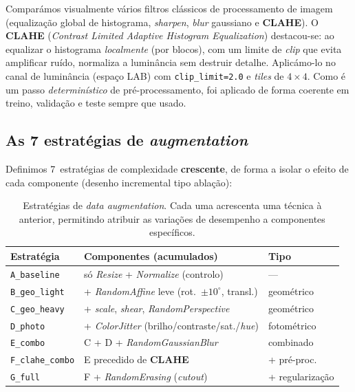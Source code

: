 \documentclass[11pt,a4paper]{article}
\begin{document}
Comparámos visualmente vários filtros clássicos de processamento de imagem (equalização
global de histograma, \emph{sharpen}, \emph{blur} gaussiano e \textbf{CLAHE}). O
\textbf{CLAHE} (\emph{Contrast Limited Adaptive Histogram Equalization}) destacou-se: ao
equalizar o histograma \emph{localmente} (por blocos), com um limite de \emph{clip} que
evita amplificar ruído, normaliza a luminância sem destruir detalhe. Aplicámo-lo no canal
de luminância (espaço LAB) com \texttt{clip\_limit=2.0} e \emph{tiles} de $4\times4$. Como
é um passo \emph{determinístico} de pré-processamento, foi aplicado de forma coerente em
treino, validação e teste sempre que usado.

\subsection{As 7 estratégias de \emph{augmentation}}

Definimos 7~estratégias de complexidade \textbf{crescente}, de forma a isolar o efeito de
cada componente (desenho incremental tipo ablação):

\begin{table}[H]
\centering
\small
\begin{tabular}{@{}lll@{}}
\toprule
\textbf{Estratégia} & \textbf{Componentes (acumulados)} & \textbf{Tipo} \\
\midrule
\texttt{A\_baseline}    & só \emph{Resize} + \emph{Normalize} (controlo)            & ---            \\
\texttt{B\_geo\_light}  & + \emph{RandomAffine} leve (rot.\ $\pm10^\circ$, transl.) & geométrico     \\
\texttt{C\_geo\_heavy}  & + \emph{scale}, \emph{shear}, \emph{RandomPerspective}    & geométrico     \\
\texttt{D\_photo}       & + \emph{ColorJitter} (brilho/contraste/sat./\emph{hue})   & fotométrico    \\
\texttt{E\_combo}       & C + D + \emph{RandomGaussianBlur}                          & combinado      \\
\texttt{F\_clahe\_combo}& E precedido de \textbf{CLAHE}                             & + pré-proc.    \\
\texttt{G\_full}        & F + \emph{RandomErasing} (\emph{cutout})                  & + regularização\\
\bottomrule
\end{tabular}
\caption{Estratégias de \emph{data augmentation}. Cada uma acrescenta uma técnica à
anterior, permitindo atribuir as variações de desempenho a componentes específicos.}
\end{table}
\end{document}
